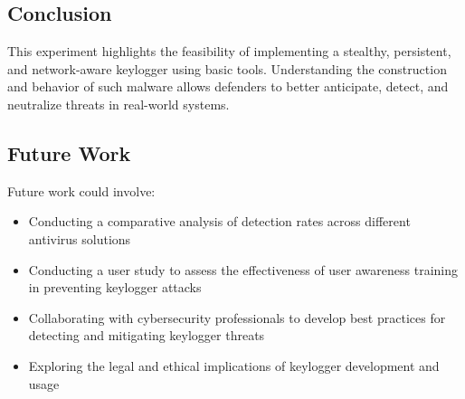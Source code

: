 \subsection{Conclusion}
This experiment highlights the feasibility of implementing a stealthy, persistent, and network-aware keylogger using basic tools. Understanding the construction and behavior of such malware allows defenders to better anticipate, detect, and neutralize threats in real-world systems.

\subsection{Future Work}
Future work could involve:
\begin{itemize} 
    \item Conducting a comparative analysis of detection rates across different antivirus solutions
    \item Conducting a user study to assess the effectiveness of user awareness training in preventing keylogger attacks
    \item Collaborating with cybersecurity professionals to develop best practices for detecting and mitigating keylogger threats
    \item Exploring the legal and ethical implications of keylogger development and usage
\end{itemize}